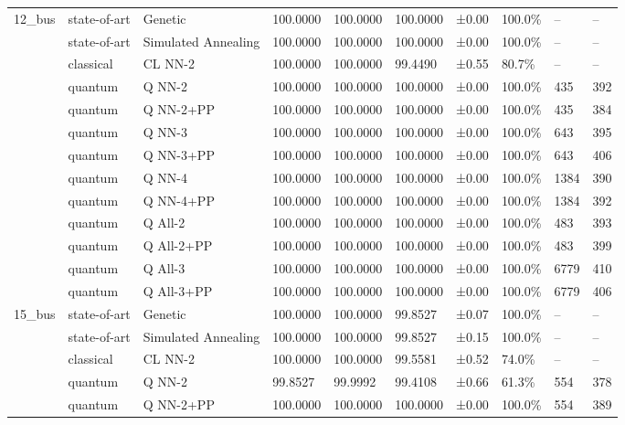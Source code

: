 \begin{table}[ht]
\begin{tabular}{llllllllll}
\midrule
\rowcolor{blue!10}
12\_bus & state-of-art & Genetic & 100.0000 & 100.0000 & 100.0000 & ±0.00 & 100.0\% & – & – \\
\rowcolor{blue!10}
 & state-of-art & Simulated Annealing & 100.0000 & 100.0000 & 100.0000 & ±0.00 & 100.0\% & – & – \\
\rowcolor{green!10}
 & classical & CL NN-2 & 100.0000 & 100.0000 & 99.4490 & ±0.55 & 80.7\% & – & – \\
\rowcolor{orange!12}
 & quantum & Q NN-2 & 100.0000 & 100.0000 & 100.0000 & ±0.00 & 100.0\% & 435 & 392 \\
\rowcolor{orange!12}
 & quantum & Q NN-2+PP & 100.0000 & 100.0000 & 100.0000 & ±0.00 & 100.0\% & 435 & 384 \\
\rowcolor{orange!12}
 & quantum & Q NN-3 & 100.0000 & 100.0000 & 100.0000 & ±0.00 & 100.0\% & 643 & 395 \\
\rowcolor{orange!12}
 & quantum & Q NN-3+PP & 100.0000 & 100.0000 & 100.0000 & ±0.00 & 100.0\% & 643 & 406 \\
\rowcolor{orange!12}
 & quantum & Q NN-4 & 100.0000 & 100.0000 & 100.0000 & ±0.00 & 100.0\% & 1384 & 390 \\
\rowcolor{orange!12}
 & quantum & Q NN-4+PP & 100.0000 & 100.0000 & 100.0000 & ±0.00 & 100.0\% & 1384 & 392 \\
\rowcolor{orange!12}
 & quantum & Q All-2 & 100.0000 & 100.0000 & 100.0000 & ±0.00 & 100.0\% & 483 & 393 \\
\rowcolor{orange!12}
 & quantum & Q All-2+PP & 100.0000 & 100.0000 & 100.0000 & ±0.00 & 100.0\% & 483 & 399 \\
\rowcolor{orange!12}
 & quantum & Q All-3 & 100.0000 & 100.0000 & 100.0000 & ±0.00 & 100.0\% & 6779 & 410 \\
\rowcolor{orange!12}
 & quantum & Q All-3+PP & 100.0000 & 100.0000 & 100.0000 & ±0.00 & 100.0\% & 6779 & 406 \\
\midrule
\rowcolor{blue!10}
15\_bus & state-of-art & Genetic & 100.0000 & 100.0000 & 99.8527 & ±0.07 & 100.0\% & – & – \\
\rowcolor{blue!10}
 & state-of-art & Simulated Annealing & 100.0000 & 100.0000 & 99.8527 & ±0.15 & 100.0\% & – & – \\
\rowcolor{green!10}
 & classical & CL NN-2 & 100.0000 & 100.0000 & 99.5581 & ±0.52 & 74.0\% & – & – \\
\rowcolor{orange!12}
 & quantum & Q NN-2 & 99.8527 & 99.9992 & 99.4108 & ±0.66 & 61.3\% & 554 & 378 \\
\rowcolor{orange!12}
 & quantum & Q NN-2+PP & 100.0000 & 100.0000 & 100.0000 & ±0.00 & 100.0\% & 554 & 389 \\

\end{tabular}
\end{table}
